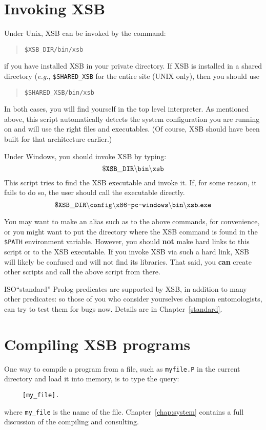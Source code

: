 \section{Invoking XSB}

Under Unix, XSB can be invoked by the command:
\begin{quote}
       \tt \$XSB\_DIR/bin/xsb
\end{quote}
if you have installed XSB in your private directory.  If XSB is
installed in a shared directory ({\it e.g.}, {\tt \$SHARED\_XSB} for
the entire site (UNIX only), then you should use
\begin{quote}
       \tt \$SHARED\_XSB/bin/xsb
\end{quote}
In both cases, you will find yourself in the top level interpreter.  
As mentioned above, this script automatically detects the system
configuration you are running on and will use the right files and
executables. (Of course, XSB should have been built for that architecture
earlier.)

Under Windows, you should invoke XSB by typing:
\[
 \tt
 \$XSB\_DIR\backslash{}bin\backslash{}xsb
\]
This script tries to find the XSB executable and invoke it. If, for some
reason, it fails to do so, the user should call the executable directly.
\[
 \tt
 \$XSB\_DIR\backslash{}config\backslash\texttt{x86-pc-windows}\backslash{}bin\backslash{}xsb.exe
\]


You may want to make an alias such as {\tt \smallourprolog} to the above
commands, for convenience, or you might want to put the directory where the
XSB command is found in the {\tt \$PATH} environment variable. However, you
should {\bf not} make hard links to this script or to the XSB executable.
If you invoke XSB via such a hard link, XSB will likely be confused and will
not find its libraries.  That said, you {\bf can} create other scripts and
call the above script from there.

ISO``standard'' Prolog predicates are supported by XSB, in addition to
many other predicates: so those of you who consider yourselves
champion entomologists, can try to test them for bugs now.  Details
are in Chapter~\ref{standard}.


\section{Compiling XSB programs}

One way to compile a program from a file, such as {\tt myfile.P} in
the current directory and load it into memory, is to type the query:
\begin{verbatim}
     [my_file].
\end{verbatim}
where \verb'my_file' is the name of the file.
Chapter~\ref{chap:system} contains a full discussion of the compiling
and consulting.

